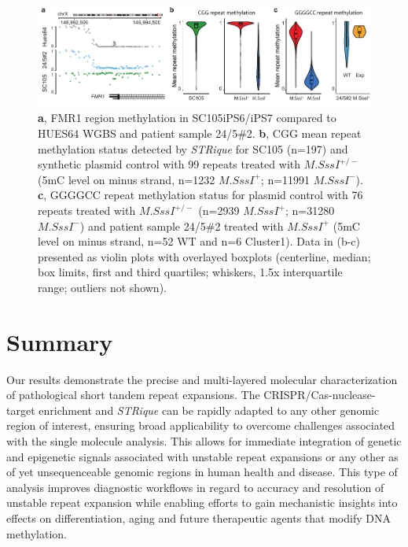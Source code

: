 \begin{figure}[h]
    \centering
    \includegraphics[width=1.0\textwidth]{figures/strique/methylation_repeat.pdf}
    \captionsetup{format=plain}
    \caption[Region and repeat methylation detection]{\textbf{a}, FMR1 region methylation in SC105iPS6/iPS7 compared to HUES64 WGBS and patient sample 24/5\#2. \textbf{b}, CGG mean repeat methylation status detected by \textit{STRique} for SC105 (n=197) and synthetic plasmid control with 99 repeats treated with $ M.SssI^{+/-} $ (5mC level on minus strand, n=1232 $ M.SssI^{+} $; n=11991 $ M.SssI^{-} $). \textbf{c}, GGGGCC repeat methylation status for plasmid control with 76 repeats treated with $ M.SssI^{+/-} $ (n=2939 $ M.SssI^{+} $; n=31280 $ M.SssI^{-} $) and patient sample 24/5\#2 treated with $ M.SssI^{+} $ (5mC level on minus strand, n=52 WT and n=6 Cluster1). Data in (b-c) presented as violin plots with overlayed boxplots (centerline, median; box limits, first and third quartiles; whiskers, 1.5x interquartile range; outliers not shown).}
    \label{fig:strique:methylation_repeat}
\end{figure}




\section{Summary}
\label{sec:strique:summary}

Our results demonstrate the precise and multi-layered molecular characterization of pathological short tandem repeat expansions. The CRISPR/Cas-nuclease-target enrichment and \textit{STRique} can be rapidly adapted to any other genomic region of interest, ensuring broad applicability to overcome challenges associated with the single molecule analysis. This allows for immediate integration of genetic and epigenetic signals associated with unstable repeat expansions or any other as of yet unsequenceable genomic regions in human health and disease. This type of analysis improves diagnostic workflows in regard to accuracy and resolution of unstable repeat expansion while enabling efforts to gain mechanistic insights into effects on differentiation, aging and future therapeutic agents that modify DNA methylation.



